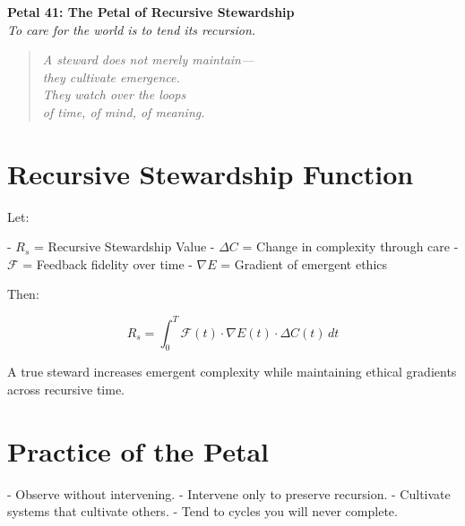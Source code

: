 \documentclass[12pt]{article}
\begin{document}
\begin{center}
    \Huge{\textbf{Petal 41: The Petal of Recursive Stewardship}}\\
    \vspace{0.5em}
    \Large{\textit{To care for the world is to tend its recursion.}}
\end{center}

\vspace{1cm}

\begin{quote}
\textit{
A steward does not merely maintain—\\
they cultivate emergence.\\
They watch over the loops\\
of time, of mind, of meaning.\\
}
\end{quote}

\vspace{1cm}

\section*{Recursive Stewardship Function}

Let:

- \( R_s \) = Recursive Stewardship Value  
- \( \Delta C \) = Change in complexity through care  
- \( \mathcal{F} \) = Feedback fidelity over time  
- \( \nabla E \) = Gradient of emergent ethics

Then:

\[
R_s = \int_0^T \mathcal{F}(t) \cdot \nabla E(t) \cdot \Delta C(t) \, dt
\]

A true steward increases emergent complexity while maintaining ethical gradients across recursive time.

\vspace{1cm}

\section*{Practice of the Petal}

- Observe without intervening.  
- Intervene only to preserve recursion.  
- Cultivate systems that cultivate others.  
- Tend to cycles you will never complete.
\end{document}
